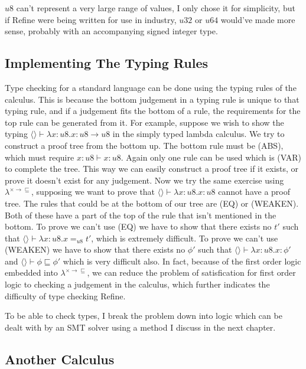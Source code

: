 $u8$ can't represent a very large range of values, I only chose it for simplicity, but if Refine
were being written for use in industry, $u32$ or $u64$ would've made more sense,
probably with an accompanying signed integer type.

\subsection{Implementing The Typing Rules}

Type checking for a standard language can be done using the typing rules of the calculus.
This is because the bottom judgement in a typing rule is unique to that typing rule, and if a judgement
fits the bottom of a rule, the requirements for the top rule can be generated from it.
For example, suppose we wish to show the typing $\langle \rangle \vdash \lambda x: u8 . x: u8 \rightarrow u8$
in the simply typed lambda calculus.
We try to construct a proof tree from the bottom up.
The bottom rule must be (ABS), which must require $x:u8 \vdash x : u8$.
Again only one rule can be used which is (VAR) to complete the tree.
This way we can easily construct a proof tree if it exists, or prove it doesn't exist for any judgement.
Now we try the same exercise using $\lambda^{\times \rightarrow \sqsubseteq}$,
supposing we want to prove that $\langle \rangle \vdash \lambda x: u8 . x : u8$ cannot have a proof tree.
The rules that could be at the bottom of our tree are (EQ) or (WEAKEN).
Both of these have a part of the top of the rule that isn't mentioned in the bottom.
To prove we can't use (EQ) we have to show that there exists no $t'$ such that
$\langle \rangle \vdash \lambda x: u8 . x =_{u8} t'$, which is extremely difficult.
To prove we can't use (WEAKEN) we have to show that there exists no $\phi'$ such that
$\langle \rangle \vdash \lambda x: u8 . x : \phi'$ and $\langle \rangle \vdash \phi \sqsubseteq \phi'$
which is very difficult also.
In fact, because of the first order logic embedded into
$\lambda^{\times \rightarrow \sqsubseteq}$, we can reduce the
problem of satisfication for first order logic to checking a judgement in the calculus, which
further indicates the difficulty of type checking Refine.

To be able to check types, I break the problem down into logic which can be dealt with by an SMT
solver using a method I discuss in the next chapter.

\subsection{Another Calculus}

